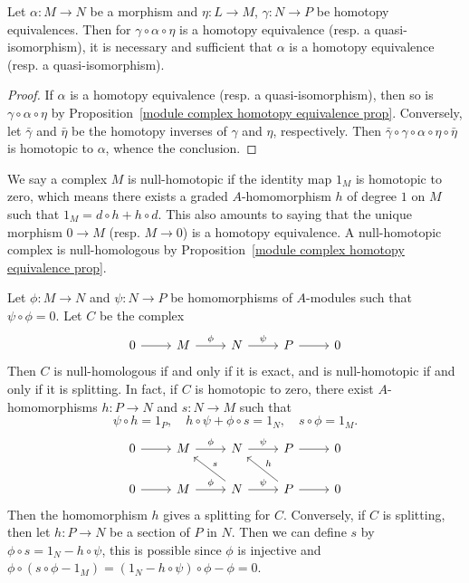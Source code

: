 \begin{corollary}
Let $\alpha:M\to N$ be a morphism and $\eta:L\to M$, $\gamma:N\to P$ be homotopy equivalences. Then for $\gamma\circ\alpha\circ\eta$ is a homotopy equivalence (resp. a quasi-isomorphism), it is necessary and sufficient that $\alpha$ is a homotopy equivalence (resp. a quasi-isomorphism).
\end{corollary}
\begin{proof}
If $\alpha$ is a homotopy equivalence (resp. a quasi-isomorphism), then so is $\gamma\circ\alpha\circ\eta$ by Proposition~\ref{module complex homotopy equivalence prop}. Conversely, let $\bar{\gamma}$ and $\bar{\eta}$ be the homotopy inverses of $\gamma$ and $\eta$, respectively. Then $\bar{\gamma}\circ\gamma\circ\alpha\circ\eta\circ\bar{\eta}$ is homotopic to $\alpha$, whence the conclusion. 
\end{proof}
We say a complex $M$ is null-homotopic if the identity map $1_M$ is homotopic to zero, which means there exists a graded $A$-homomorphism $h$ of degree $1$ on $M$ such that $1_M=d\circ h+h\circ d$. This also amounts to saying that the unique morphism $0\to M$ (resp. $M\to 0$) is a homotopy equivalence. A null-homotopic complex is null-homologous by Proposition~\ref{module complex homotopy equivalence prop}.
\begin{example}
Let $\phi:M\to N$ and $\psi:N\to P$ be homomorphisms of $A$-modules such that $\psi\circ\phi=0$. Let $C$ be the complex
\[\begin{tikzcd}
0\ar[r]&M\ar[r,"\phi"]&N\ar[r,"\psi"]&P\ar[r]&0
\end{tikzcd}\]
Then $C$ is null-homologous if and only if it is exact, and is null-homotopic if and only if it is splitting. In fact, if $C$ is homotopic to zero, there exist $A$-homomorphisms $h:P\to N$ and $s:N\to M$ such that
\[\psi\circ h=1_P,\quad h\circ\psi+\phi\circ s=1_N,\quad s\circ\phi=1_M.\]
\[\begin{tikzcd}
0\ar[r]&M\ar[r,"\phi"]&N\ar[r,"\psi"]&P\ar[r]&0\\
0\ar[r]&M\ar[r,"\phi"]&N\ar[lu,swap,"s"]\ar[r,"\psi"]&P\ar[r]\ar[lu,swap,"h"]&0
\end{tikzcd}\]
Then the homomorphism $h$ gives a splitting for $C$. Conversely, if $C$ is splitting, then let $h:P\to N$ be a section of $P$ in $N$. Then we can define $s$ by $\phi\circ s=1_N-h\circ\psi$, this is possible since $\phi$ is injective and $\phi\circ(s\circ\phi-1_M)=(1_N-h\circ\psi)\circ\phi-\phi=0$.
\end{example}
